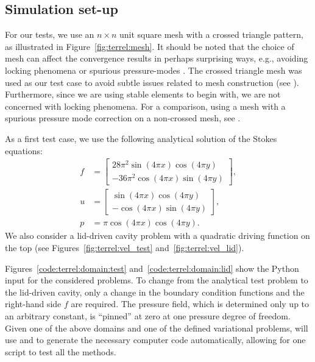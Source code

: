\subsection{Simulation set-up}

For our tests, we use an $n \times n$ unit square mesh with a crossed
triangle pattern, as illustrated in Figure~\ref{fig:terrel:mesh}. It
should be noted that the choice of mesh can affect the convergence
results in perhaps surprising ways, e.g., avoiding locking
phenomena \citep{NagtegaalDeJong1974} or spurious pressure-modes
\citep{Malkus2000}. The crossed triangle mesh was used as our
test case to avoid subtle issues related to mesh construction (see
\citet[Proposition~6.1, Section~VI.6]{BrezziFortin1991}). Furthermore,
since we are using stable elements to begin with, we are not
concerned with locking phenomena. For a comparison, using a mesh
with a spurious pressure mode correction on a non-crossed mesh, see
\citet{TerrelScott2008}.

As a first test case, we use the following analytical solution of the
Stokes equations:
%
\begin{align}
\label{eqn:terrel:testcase}
  f &=
    \begin{bmatrix}
      28\pi^2\sin(4\pi x)\cos(4\pi y)
      \\
      -36\pi^2\cos(4\pi x)\sin(4\pi y)
    \end{bmatrix},
\\
  u &=
  \begin{bmatrix}
    \sin(4\pi x)\cos(4\pi y)
      \\
     -\cos(4\pi x)\sin(4\pi y)
   \end{bmatrix},
\\
  p &= \pi\cos(4\pi x)\cos(4\pi y).
\end{align}
%
We also consider a lid-driven cavity problem with a quadratic
driving function on the top (see Figures~\ref{fig:terrel:vel_test}
and~\ref{fig:terrel:vel_lid}).

Figures~\ref{code:terrel:domain:test} and~\ref{code:terrel:domain:lid}
show the \dolfin{} Python input for the considered problems. To change
from the analytical test problem to the lid-driven cavity, only a
change in the boundary condition functions and the right-hand side
$f$ are required.  The pressure field, which is determined only up to
an arbitrary constant, is ``pinned'' at zero at one pressure degree
of freedom.  Given one of the above domains and one of the defined
variational problems, \dolfin{} will use \ffc{} and \fiat{} to generate
the necessary computer code automatically, allowing for one script to
test all the methods.

